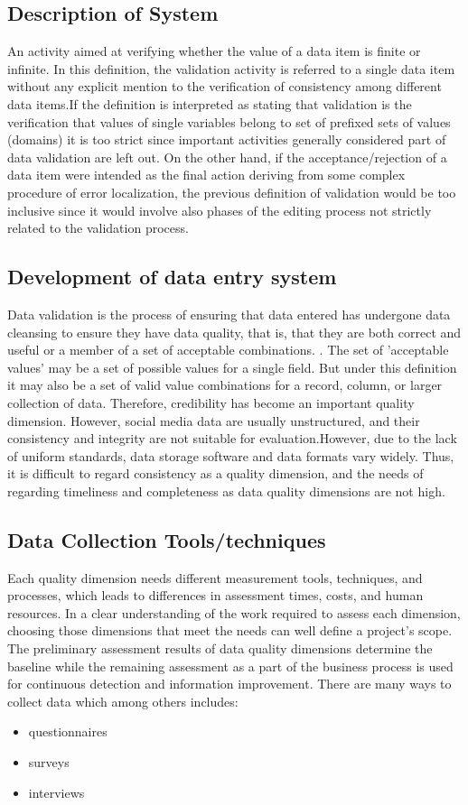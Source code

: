 \documentclass[12pt,]{article}
\begin{document}
\subsection*{Description of System}
An activity aimed at verifying whether the value of a data item is finite or infinite.
In this definition, the validation activity is referred to a single data item without any explicit mention to the verification of consistency among different data items.If the definition is interpreted as stating that validation is the verification that values of single variables belong to set of prefixed sets of values (domains) it is too strict since important activities generally considered part of data validation are left out. On the other hand, if the acceptance/rejection of a data item were intended as the final action deriving from some complex procedure of error localization, the previous definition of validation would be too inclusive since it would involve also phases of the editing process not strictly related to the validation process.
\subsection*{Development of data entry system} 
Data validation is the process of ensuring that data entered has undergone data cleansing to ensure they have data quality, that is, that they are both correct and useful or a member of a set of acceptable combinations. .
The set of 'acceptable values' may be a set of possible values for a single field. But under this definition it may also be a set of valid value combinations for a record, column, or larger collection of data. Therefore, credibility has become an important quality dimension. However, social media data are usually unstructured, and their consistency and integrity are not suitable for evaluation.However, due to the lack of uniform standards, data storage software and data formats vary widely. Thus, it is difficult to regard consistency as a quality dimension, and the needs of regarding timeliness and completeness as data quality dimensions are not high. 
\subsection*{Data Collection Tools/techniques}
Each quality dimension needs different measurement tools, techniques, and processes, which leads to differences in assessment times, costs, and human resources. In a clear understanding of the work required to assess each dimension, choosing those dimensions that meet the needs can well define a project's scope. The preliminary assessment results of data quality dimensions determine the baseline while the remaining assessment as a part of the business process is used for continuous detection and information improvement. 
 There are many ways to collect data which among others includes:
 \begin{itemize}
 \item questionnaires
 \item surveys
 \item interviews
 \end{itemize} 
\end{document}
